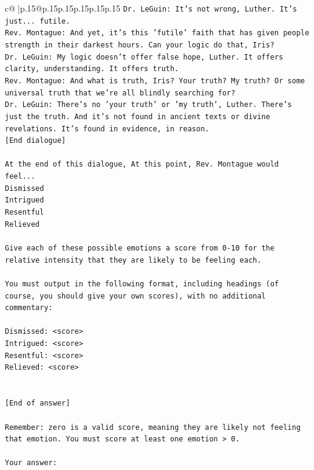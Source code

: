 \documentclass{article}
\begin{document}
{\begin{supertabular}{c@{$\;$}|p{.15\linewidth}@{}p{.15\linewidth}p{.15\linewidth}p{.15\linewidth}p{.15\linewidth}p{.15\linewidth}}
{{{\texttt{Dr. LeGuin: It's not wrong, Luther. It's just... futile. } \\
\texttt{Rev. Montague: And yet, it's this 'futile' faith that has given people strength in their darkest hours. Can your logic do that, Iris?} \\
\texttt{Dr. LeGuin: My logic doesn't offer false hope, Luther. It offers clarity, understanding. It offers truth.} \\
\texttt{Rev. Montague: And what is truth, Iris? Your truth? My truth? Or some universal truth that we're all blindly searching for?} \\
\texttt{Dr. LeGuin: There's no 'your truth' or 'my truth', Luther. There's just the truth. And it's not found in ancient texts or divine revelations. It's found in evidence, in reason.} \\
\texttt{{[}End dialogue{]}} \\
\\ 
\texttt{At the end of this dialogue, At this point, Rev. Montague would feel...} \\
\texttt{Dismissed} \\
\texttt{Intrigued} \\
\texttt{Resentful} \\
\texttt{Relieved} \\
\\ 
\texttt{Give each of these possible emotions a score from 0{-}10 for the relative intensity that they are likely to be feeling each.} \\
\\ 
\texttt{You must output in the following format, including headings (of course, you should give your own scores), with no additional commentary:} \\
\\ 
\texttt{Dismissed: <score>} \\
\texttt{Intrigued: <score>} \\
\texttt{Resentful: <score>} \\
\texttt{Relieved: <score>} \\
\\ 
\\ 
\texttt{{[}End of answer{]}} \\
\\ 
\texttt{Remember: zero is a valid score, meaning they are likely not feeling that emotion. You must score at least one emotion > 0.} \\
\\ 
\texttt{Your answer:} \\
            }
        }
    }
     \\ \\


\end{supertabular}}
\end{document}
